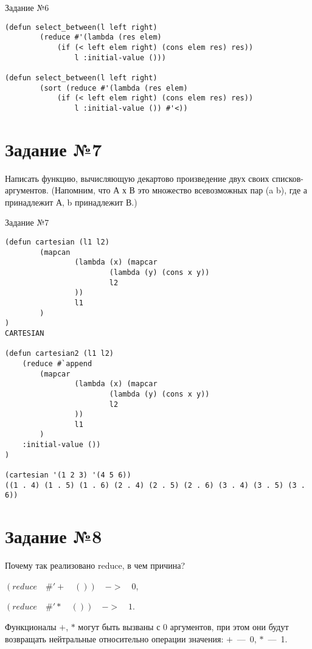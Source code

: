 \begin{code}
\caption{Задание №6}
\label{code:bf4}
\begin{verbatim}
(defun select_between(l left right)
        (reduce #'(lambda (res elem) 
            (if (< left elem right) (cons elem res) res)) 
                l :initial-value ()))
                
(defun select_between(l left right)
        (sort (reduce #'(lambda (res elem) 
            (if (< left elem right) (cons elem res) res)) 
                l :initial-value ()) #'<))
\end{verbatim}
\end{code}

\section{Задание №7}
Написать функцию, вычисляющую декартово произведение двух своих списков- аргументов. (Напомним, что А х В это множество всевозможных пар (a b), где а принадлежит А, b принадлежит В.)


\begin{code}
\caption{Задание №7}
\label{code:bf4}
\begin{verbatim}
(defun cartesian (l1 l2)
        (mapcan
                (lambda (x) (mapcar
                        (lambda (y) (cons x y))
                        l2
                ))
                l1
        )
)
CARTESIAN

(defun cartesian2 (l1 l2)
	(reduce #`append
        (mapcar
                (lambda (x) (mapcar
                        (lambda (y) (cons x y))
                        l2
                ))
                l1
        )
    :initial-value ())
)

(cartesian '(1 2 3) '(4 5 6))
((1 . 4) (1 . 5) (1 . 6) (2 . 4) (2 . 5) (2 . 6) (3 . 4) (3 . 5) (3 . 6))
\end{verbatim}
\end{code}

\section{Задание №8}
Почему так реализовано reduce, в чем причина? 

$(reduce \quad \#'+ \quad ()) \quad -> \quad 0$,
 
$(reduce \quad \#'* \quad ()) \quad -> \quad 1$.

Функционалы $+$, $*$ могут быть вызваны с 0 аргументов, при этом они будут возвращать нейтральные относительно операции значения: $+$~---~0, $*$~---~1.

